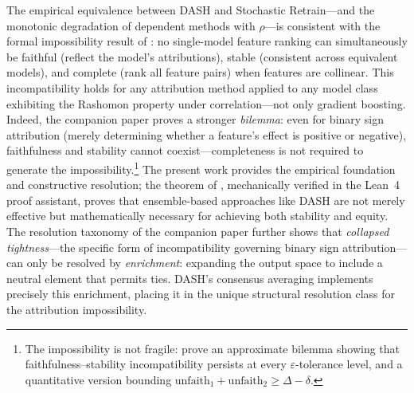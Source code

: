 \documentclass[10pt]{article}
\newcommand{\dash}{\textsc{DASH}}
\newcommand{\rhovar}{\rho}
\begin{document}
The empirical equivalence between \dash{} and Stochastic Retrain---and
the monotonic degradation of dependent methods with
$\rhovar$---is consistent with the formal impossibility result of
\citet{caraker2026impossibility}: no
single-model feature ranking can simultaneously be faithful (reflect
the model's attributions), stable (consistent across equivalent models),
and complete (rank all feature pairs) when features are collinear.
This incompatibility holds for any attribution method applied to any model
class exhibiting the Rashomon property under correlation---not only
gradient boosting.  Indeed, the companion paper proves a stronger
\emph{bilemma}: even for binary sign attribution (merely determining
whether a feature's effect is positive or negative), faithfulness and
stability cannot coexist---completeness is not required to generate the
impossibility.\footnote{The impossibility is not fragile:
\citet{caraker2026impossibility} prove an approximate bilemma showing
that faithfulness--stability incompatibility persists at every
$\varepsilon$-tolerance level, and a quantitative version bounding
$\text{unfaith}_1 + \text{unfaith}_2 \geq \Delta - \delta$.}
The present work provides the empirical foundation
and constructive resolution; the theorem of \citet{caraker2026impossibility},
mechanically verified in the Lean~4 proof assistant, proves that ensemble-based
approaches like \dash{} are not merely effective but mathematically
necessary for achieving both stability and equity.
The resolution taxonomy of the companion paper further shows that
\emph{collapsed tightness}---the specific form of incompatibility
governing binary sign attribution---can only be resolved by
\emph{enrichment}: expanding the output space to include a neutral
element that permits ties.  \dash{}'s consensus averaging implements
precisely this enrichment, placing it in the unique structural
resolution class for the attribution impossibility.
\end{document}
